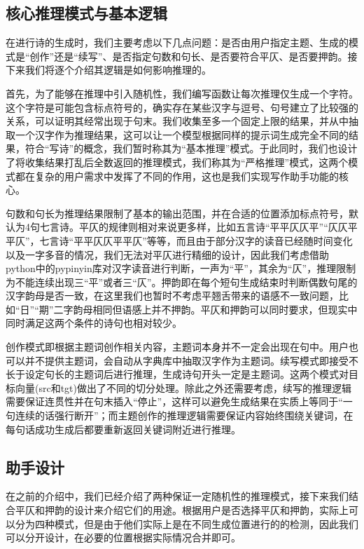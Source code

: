 \subsection{核心推理模式与基本逻辑}
在进行诗的生成时，我们主要考虑以下几点问题：是否由用户指定主题、生成的模式是“创作”还是“续写”、是否指定句数和句长、是否要符合平仄、是否要押韵。接下来我们将逐个介绍其逻辑是如何影响推理的。

首先，为了能够在推理中引入随机性，我们编写函数让每次推理仅生成一个字符。这个字符是可能包含标点符号的，确实存在某些汉字与逗号、句号建立了比较强的关系，可以证明其经常出现于句末。我们收集至多一个固定上限的结果，并从中抽取一个汉字作为推理结果，这可以让一个模型根据同样的提示词生成完全不同的结果，符合“写诗”的概念，我们暂时称其为“基本推理”模式。于此同时，我们也设计了将收集结果打乱后全数返回的推理模式，我们称其为“严格推理”模式，这两个模式都在复杂的用户需求中发挥了不同的作用，这也是我们实现写作助手功能的核心。

句数和句长为推理结果限制了基本的输出范围，并在合适的位置添加标点符号，默认为4句七言诗。平仄的规律则相对来说更多样，比如五言诗“平平仄仄平”“仄仄平平仄”，七言诗“平平仄仄平平仄”等等，而且由于部分汉字的读音已经随时间变化以及一字多音的情况，我们无法对平仄进行精细的设计，因此我们考虑借助python中的pypinyin库对汉字读音进行判断，一声为“平”，其余为“仄”，推理限制为不能连续出现三“平”或者三“仄”。押韵即在每个短句生成结束时判断偶数句尾的汉字韵母是否一致，在这里我们也暂时不考虑平翘舌带来的语感不一致问题，比如“日”“期”二字韵母相同但语感上并不押韵。平仄和押韵可以同时要求，但现实中同时满足这两个条件的诗句也相对较少。

创作模式即根据主题词创作相关内容，主题词本身并不一定会出现在句中。用户也可以并不提供主题词，会自动从字典库中抽取汉字作为主题词。续写模式即接受不长于设定句长的主题词后进行推理，生成诗句开头一定是主题词。这两个模式对目标向量(src和tgt)做出了不同的切分处理。除此之外还需要考虑，续写的推理逻辑需要保证连贯性并在句末插入“停止”，这样可以避免生成结果在实质上等同于“一句连续的话强行断开”；而主题创作的推理逻辑需要保证内容始终围绕关键词，在每句话成功生成后都要重新返回关键词附近进行推理。

\subsection{助手设计}
在之前的介绍中，我们已经介绍了两种保证一定随机性的推理模式，接下来我们结合平仄和押韵的设计来介绍它们的用途。根据用户是否选择平仄和押韵，实际上可以分为四种模式，但是由于他们实际上是在不同生成位置进行的的检测，因此我们可以分开设计，在必要的位置根据实际情况合并即可。

